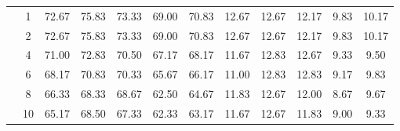 \begin{table}[H]
\begin{tabular}{|c|c|c c c c c|c c c c c|}
\multicolumn{1}{|c|}{ \multirow{6}{*}{\rotatebox[origin=c]{90}{\textbf{K-vizinhos}}} }
& 1	& 72.67	& 75.83	& 73.33	& 69.00	& 70.83& 12.67	& 12.67	& 12.17& 	9.83	& 10.17 \\\cline{2-12}
& 2	& 72.67	& 75.83	& 73.33	& 69.00	& 70.83& 12.67	& 12.67	& 12.17& 	9.83	& 10.17 \\\cline{2-12}
& 4	& 71.00	& 72.83	& 70.50	& 67.17	& 68.17& 11.67	& 12.83	& 12.67& 	9.33	& 	9.50 \\\cline{2-12}
& 6	& 68.17	& 70.83	& 70.33	& 65.67	& 66.17& 11.00	& 12.83	& 12.83& 	9.17	& 	9.83 \\\cline{2-12}
& 8	& 66.33	& 68.33	& 68.67	& 62.50	& 64.67& 11.83	& 12.67	& 12.00& 	8.67	& 	9.67 \\\cline{2-12}
& 10& 65.17	& 68.50	& 67.33	& 62.33	& 63.17& 11.67	& 12.67	& 11.83& 	9.00	& 	9.33 \\\midrule



	\end{tabular}
\end{table}


